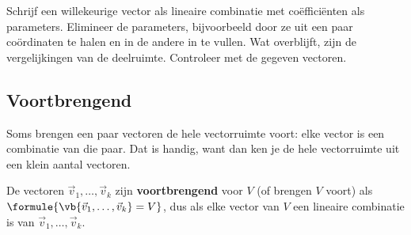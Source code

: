 \begin{werkwijze}
Schrijf een willekeurige vector als lineaire combinatie met coëfficiënten als parameters. Elimineer de parameters, bijvoorbeeld door ze uit een paar coördinaten te halen en in de andere in te vullen. Wat overblijft, zijn de vergelijkingen van de deelruimte. Controleer met de gegeven vectoren.
\end{werkwijze}

\begin{oefeningen}
\end{oefeningen}

\subsection{Voortbrengend}

Soms brengen een paar vectoren de hele vectorruimte voort: elke vector is een combinatie van die paar. Dat is handig, want dan ken je de hele vectorruimte uit een klein aantal vectoren.

\begin{theorie}
De vectoren $\vec v_1, \ldots, \vec v_k$ zijn \textbf{\textcolor{accent}{voortbrengend}} voor $V$ (of brengen $V$ voort) als $\formule{\vb{\vec v_1, \ldots, \vec v_k} = V}$, dus als elke vector van $V$ een lineaire combinatie is van $\vec v_1, \ldots, \vec v_k$.
\end{theorie}


